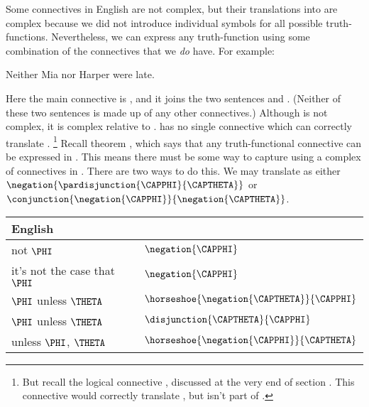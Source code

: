 \begin{majorILnc}{}
	Some connectives in English are not complex, but their translations into \GSL{} are complex because we did not introduce individual
	symbols for all possible truth-functions. Nevertheless, we can express any truth-function using some combination of the \GSL{} connectives that we \emph{do} have.
	For example: 
	\begin{menumerate}
		\item\label{GSLTransSentenceU} Neither Mia nor Harper were late.
	\end{menumerate} 
	Here the main connective is , and it joins the two sentences  and . 
	(Neither of these two sentences is made up of any other connectives.) 
	Although  is not complex, it is complex relative to \GSL{}. 
	\GSL{} has no single connective which can correctly translate .%
	\footnote{%
		But recall the logical connective , discussed at the very end of section . 
		This connective would correctly translate , but isn't part of \GSL{}. 
	} 
	Recall theorem , which says that any truth-functional connective can be expressed in \GSL{}. 
	This means there must be some way to capture  using a complex of connectives in \GSL{}. 
	There are two ways to do this.  We may translate  as either $\negation{\pardisjunction{\CAPPHI}{\CAPTHETA}}$ or $\conjunction{\negation{\CAPPHI}}{\negation{\CAPTHETA}}$.
	\begin{table}
		\renewcommand{\arraystretch}{1.5}%
		\begin{center}
			\begin{tabular}{ l l } %
				\toprule
				\textbf{English} & \textbf{\GSL{}} \\ 
				\midrule
				not $\PHI$ & $\negation{\CAPPHI}$ \\
				it's not the case that $\PHI$ & $\negation{\CAPPHI}$ \\
				$\PHI$ unless $\THETA$ & $\horseshoe{\negation{\CAPTHETA}}{\CAPPHI}$ \\
				$\PHI$ unless $\THETA$ & $\disjunction{\CAPTHETA}{\CAPPHI}$ \\
				unless $\PHI$, $\THETA$ & $\horseshoe{\negation{\CAPPHI}}{\CAPTHETA}$ \\

\end{tabular}
\end{center}
\end{table}
\end{majorILnc}

